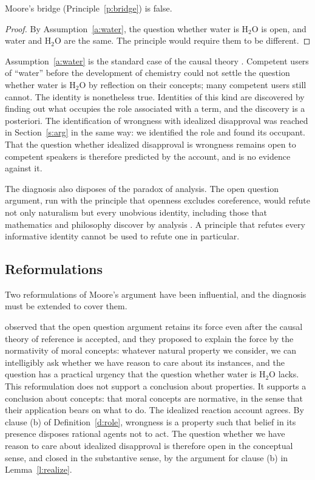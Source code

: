 \documentclass{situationist-preprint}
\begin{document}
\begin{proposition}\label{p:bridgefalse}
Moore's bridge (Principle~\ref{p:bridge}) is false.
\end{proposition}

\begin{proof}
By Assumption~\ref{a:water}, the question whether water is H$_2$O is open, and water and H$_2$O are the same. The principle would require them to be different.
\end{proof}

Assumption~\ref{a:water} is the standard case of the causal theory \citep{Kripke1980,Putnam1975}. Competent users of \enquote{water} before the development of chemistry could not settle the question whether water is H$_2$O by reflection on their concepts; many competent users still cannot. The identity is nonetheless true. Identities of this kind are discovered by finding out what occupies the role associated with a term, and the discovery is a posteriori. The identification of wrongness with idealized disapproval was reached in Section~\ref{s:arg} in the same way: we identified the role and found its occupant. That the question whether idealized disapproval is wrongness remains open to competent speakers is therefore predicted by the account, and is no evidence against it.

The diagnosis also disposes of the paradox of analysis. The open question argument, run with the principle that openness excludes coreference, would refute not only naturalism but every unobvious identity, including those that mathematics and philosophy discover by analysis \citep{Langford1942}. A principle that refutes every informative identity cannot be used to refute one in particular.

\subsection{Reformulations}

Two reformulations of Moore's argument have been influential, and the diagnosis must be extended to cover them.

\citet{DGR1992} observed that the open question argument retains its force even after the causal theory of reference is accepted, and they proposed to explain the force by the normativity of moral concepts: whatever natural property we consider, we can intelligibly ask whether we have reason to care about its instances, and the question has a practical urgency that the question whether water is H$_2$O lacks. This reformulation does not support a conclusion about properties. It supports a conclusion about concepts: that moral concepts are normative, in the sense that their application bears on what to do. The idealized reaction account agrees. By clause (b) of Definition~\ref{d:role}, wrongness is a property such that belief in its presence disposes rational agents not to act. The question whether we have reason to care about idealized disapproval is therefore open in the conceptual sense, and closed in the substantive sense, by the argument for clause (b) in Lemma~\ref{l:realize}.
\end{document}
